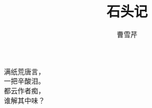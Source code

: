 \documentclass[12pt]{article}
\title{石头记}
\author{曹雪芹}
\date{}
\begin{document}
\maketitle

\begin{center}
满纸荒唐言，\\
一把辛酸泪。\\
都云作者痴，\\
谁解其中味？\\
\end{center}
\end{document}
